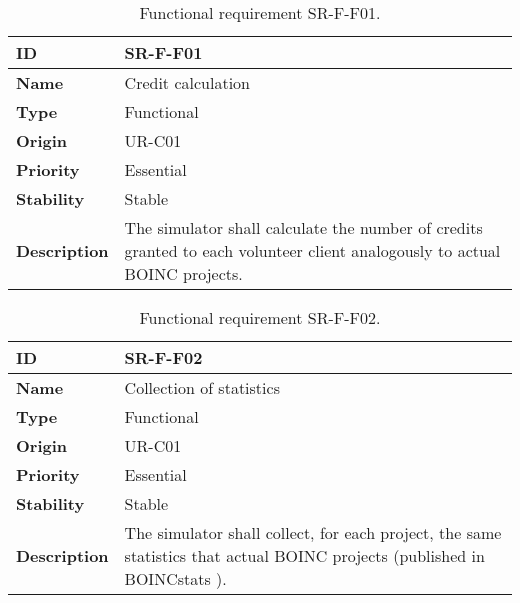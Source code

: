 \begin{center}
\begin{table*}[htbp]
\centering
\begin{tabular}{@{}p{2.5cm} p{9cm}@{}} 
\toprule
\textbf{ID} 				& SR-F-F01\\
\midrule
\textbf{Name} 			& Credit calculation \\
\midrule
\textbf{Type} 			& Functional \\
\midrule
\textbf{Origin} 			& UR-C01 \\
\midrule
\textbf{Priority}		& Essential \\
\midrule
\textbf{Stability} 		& Stable \\
\midrule
\textbf{Description} 	& The simulator shall calculate the number of credits granted to each volunteer client analogously to actual BOINC projects. \\
\bottomrule
\end{tabular}
\caption{Functional requirement SR-F-F01.}
\label{tab:srff01}
\end{table*}
\end{center}

\begin{center}
\begin{table*}[htbp]
\centering
\begin{tabular}{@{}p{2.5cm} p{9cm}@{}} 
\toprule
\textbf{ID} 				& SR-F-F02\\
\midrule
\textbf{Name} 			& Collection of statistics \\
\midrule
\textbf{Type} 			& Functional \\
\midrule
\textbf{Origin} 			& UR-C01 \\
\midrule
\textbf{Priority}		& Essential \\
\midrule
\textbf{Stability} 		& Stable \\
\midrule
\textbf{Description} 	& The simulator shall collect, for each project, the same statistics that actual BOINC projects (published in BOINCstats \cite{BOINC2016}). \\
\bottomrule
\end{tabular}
\caption{Functional requirement SR-F-F02.}
\label{tab:srff02}
\end{table*}
\end{center}

